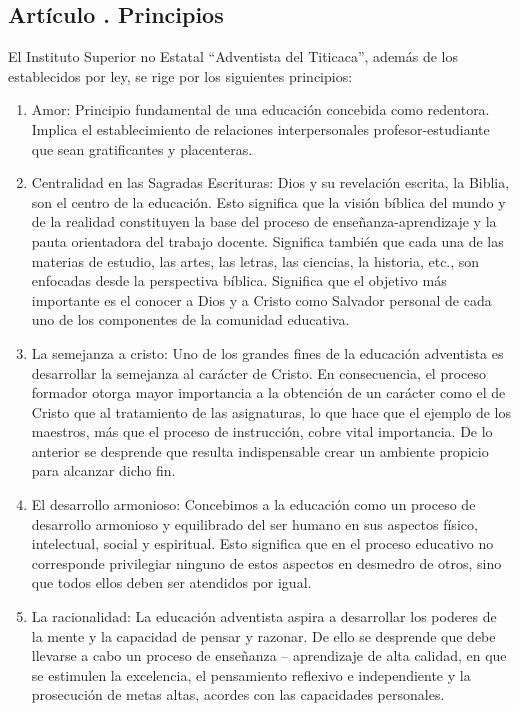 \subsection{Artículo . Principios}
\addtocounter{ns}{1}
El Instituto Superior no Estatal “Adventista del Titicaca”, además de los establecidos por ley, se rige por los siguientes principios:
\begin{enumerate}
\item Amor: Principio fundamental de una educación concebida como redentora. Implica el establecimiento de relaciones interpersonales profesor-estudiante que sean gratificantes y placenteras. 
\item Centralidad en las Sagradas Escrituras: Dios y su revelación escrita, la Biblia, son el centro de la educación. Esto significa que la visión bíblica del mundo y de la realidad constituyen la base del proceso de enseñanza-aprendizaje y la pauta orientadora del trabajo docente. Significa también que cada una de las materias de estudio, las artes, las letras, las ciencias, la historia, etc., son enfocadas desde la perspectiva bíblica. Significa que el objetivo más importante es el conocer a Dios y a Cristo como Salvador personal de cada uno de los componentes de la comunidad educativa. 
\item La semejanza a cristo: Uno de los grandes fines de la educación adventista es desarrollar la semejanza al carácter de Cristo. En consecuencia, el proceso formador otorga mayor importancia a la obtención de un carácter como el de Cristo que al tratamiento de las asignaturas, lo que hace que el ejemplo de los maestros, más que el proceso de instrucción, cobre vital importancia. De lo anterior se desprende que resulta indispensable crear un ambiente propicio para alcanzar dicho fin. 
\item El desarrollo armonioso: Concebimos a la educación como un proceso de desarrollo armonioso y equilibrado del ser humano en sus aspectos físico, intelectual, social y espiritual. Esto significa que en el proceso educativo no corresponde privilegiar ninguno de estos aspectos en desmedro de otros, sino que todos ellos deben ser atendidos por igual. 
\item La racionalidad: La educación adventista aspira a desarrollar los poderes de la mente y la capacidad de pensar y razonar. De ello se desprende que debe llevarse a cabo un proceso de enseñanza – aprendizaje de alta calidad, en que se estimulen la excelencia, el pensamiento reflexivo e independiente y la prosecución de metas altas, acordes con las capacidades personales. 

\end{enumerate}
